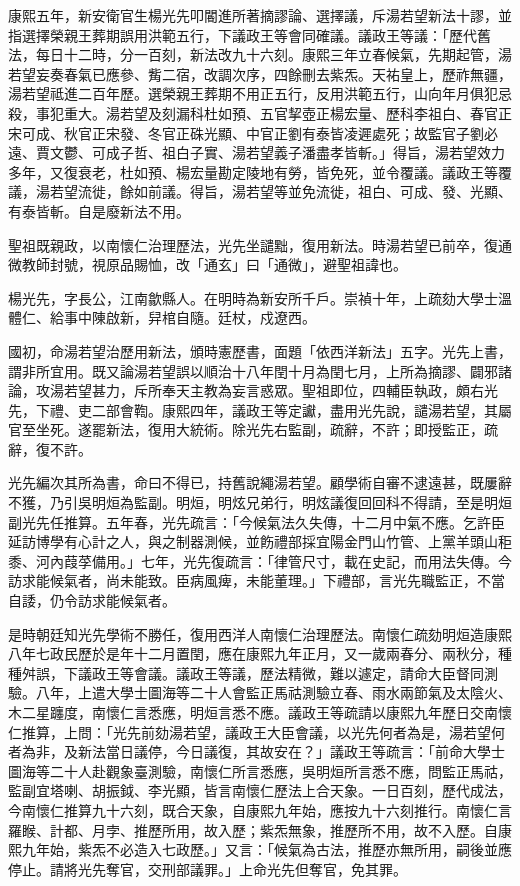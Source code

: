 \begin{pinyinscope}
康熙五年，新安衛官生楊光先叩閽進所著摘謬論、選擇議，斥湯若望新法十謬，並指選擇榮親王葬期誤用洪範五行，下議政王等會同確議。議政王等議：「歷代舊法，每日十二時，分一百刻，新法改九十六刻。康熙三年立春候氣，先期起管，湯若望妄奏春氣已應參、觜二宿，改調次序，四餘刪去紫炁。天祐皇上，歷祚無疆，湯若望祗進二百年歷。選榮親王葬期不用正五行，反用洪範五行，山向年月俱犯忌殺，事犯重大。湯若望及刻漏科杜如預、五官挈壺正楊宏量、歷科李祖白、春官正宋可成、秋官正宋發、冬官正硃光顯、中官正劉有泰皆凌遲處死；故監官子劉必遠、賈文鬱、可成子哲、祖白子實、湯若望義子潘盡孝皆斬。」得旨，湯若望效力多年，又復衰老，杜如預、楊宏量勘定陵地有勞，皆免死，並令覆議。議政王等覆議，湯若望流徙，餘如前議。得旨，湯若望等並免流徙，祖白、可成、發、光顯、有泰皆斬。自是廢新法不用。

聖祖既親政，以南懷仁治理歷法，光先坐譴黜，復用新法。時湯若望已前卒，復通微教師封號，視原品賜恤，改「通玄」曰「通微」，避聖祖諱也。

楊光先，字長公，江南歙縣人。在明時為新安所千戶。崇禎十年，上疏劾大學士溫體仁、給事中陳啟新，舁棺自隨。廷杖，戍遼西。

國初，命湯若望治歷用新法，頒時憲歷書，面題「依西洋新法」五字。光先上書，謂非所宜用。既又論湯若望誤以順治十八年閏十月為閏七月，上所為摘謬、闢邪諸論，攻湯若望甚力，斥所奉天主教為妄言惑眾。聖祖即位，四輔臣執政，頗右光先，下禮、吏二部會鞫。康熙四年，議政王等定讞，盡用光先說，譴湯若望，其屬官至坐死。遂罷新法，復用大統術。除光先右監副，疏辭，不許；即授監正，疏辭，復不許。

光先編次其所為書，命曰不得已，持舊說繩湯若望。顧學術自審不逮遠甚，既屢辭不獲，乃引吳明烜為監副。明烜，明炫兄弟行，明炫議復回回科不得請，至是明烜副光先任推算。五年春，光先疏言：「今候氣法久失傳，十二月中氣不應。乞許臣延訪博學有心計之人，與之制器測候，並飭禮部採宜陽金門山竹管、上黨羊頭山秬黍、河內葭莩備用。」七年，光先復疏言：「律管尺寸，載在史記，而用法失傳。今訪求能候氣者，尚未能致。臣病風痺，未能董理。」下禮部，言光先職監正，不當自諉，仍令訪求能候氣者。

是時朝廷知光先學術不勝任，復用西洋人南懷仁治理歷法。南懷仁疏劾明烜造康熙八年七政民歷於是年十二月置閏，應在康熙九年正月，又一歲兩春分、兩秋分，種種舛誤，下議政王等會議。議政王等議，歷法精微，難以遽定，請命大臣督同測驗。八年，上遣大學士圖海等二十人會監正馬祜測驗立春、雨水兩節氣及太陰火、木二星躔度，南懷仁言悉應，明烜言悉不應。議政王等疏請以康熙九年歷日交南懷仁推算，上問：「光先前劾湯若望，議政王大臣會議，以光先何者為是，湯若望何者為非，及新法當日議停，今日議復，其故安在？」議政王等疏言：「前命大學士圖海等二十人赴觀象臺測驗，南懷仁所言悉應，吳明烜所言悉不應，問監正馬祜，監副宜塔喇、胡振鉞、李光顯，皆言南懷仁歷法上合天象。一日百刻，歷代成法，今南懷仁推算九十六刻，既合天象，自康熙九年始，應按九十六刻推行。南懷仁言羅睺、計都、月孛、推歷所用，故入歷；紫炁無象，推歷所不用，故不入歷。自康熙九年始，紫炁不必造入七政歷。」又言：「候氣為古法，推歷亦無所用，嗣後並應停止。請將光先奪官，交刑部議罪。」上命光先但奪官，免其罪。


\end{pinyinscope}
